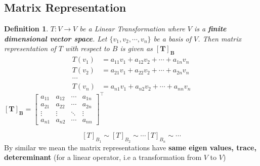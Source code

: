\documentclass[a4paper, titlepage]{article}
\newtheorem{definition}{Definition}[section]
\begin{document}
    \subsection{Matrix Representation}
        \begin{definition}
            $T: V \rightarrow V$ be a Linear Transformation where $V$
            is a \textbf{finite dimensional vector space}. Let $\{
            v_1, v_2, \cdots, v_n\}$ be a basis of $V$. Then matrix
            representation of $T$ with respect to $B$ is given as $\bm{[T]_B}$
            \begin{align*}
                T(v_1) &= a_{11}v_1 + a_{12}v_2 + \cdots + a_{1n}v_n \\
                T(v_2) &= a_{21}v_1 + a_{22}v_2 + \cdots + a_{2n}v_n \\
                \cdots \\
                T(v_n) &= a_{n1}v_1 + a_{n2}v_2 + \cdots + a_{nn}v_n
            \end{align*}
            $
                \bm{[T]_B} = 
                        \begin{bmatrix}
                            a_{11} & a_{12} & \cdots & a_{1n} \\
                            a_{21} & a_{22} & \cdots & a_{2n} \\
                            \vdots & \vdots & \ddots & \vdots \\
                            a_{n1} & a_{n2} & \cdots & a_{nn}
                        \end{bmatrix} ^ \intercal
            $
        \end{definition}
        $$[T]_{B_1} \sim [T]_{B_2} \sim \cdots [T]_{B_n} \sim \cdots $$
        By similar we mean the matrix representations have \textbf{%
        same eigen values, trace, detereminant} (for a linear 
        operator, i.e a transformation from $V$ to $V$)
    
\end{document}
